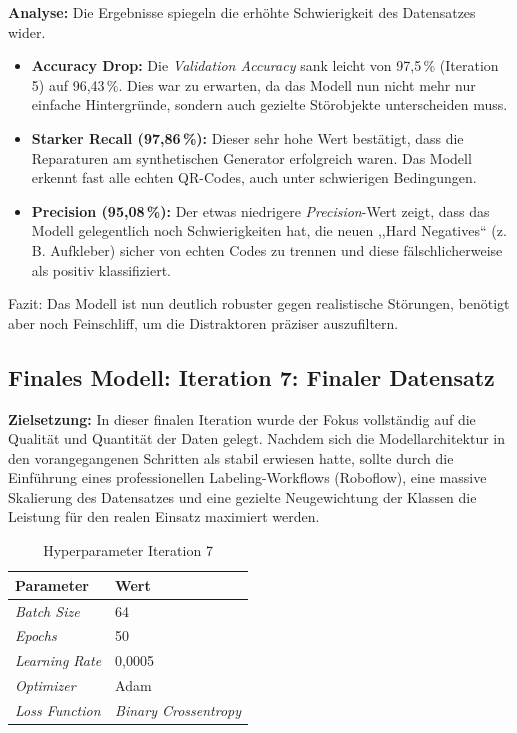 \documentclass[
    a4paper,        %
    11pt,           %
    ngerman,        %
    parskip=half,   %
    listof=totoc,   %
    bibliography=totoc %
]{scrartcl}
\begin{document}
\textbf{Analyse:}
Die Ergebnisse spiegeln die erhöhte Schwierigkeit des Datensatzes wider.
\begin{itemize}
    \item \textbf{Accuracy Drop:} Die \textit{Validation Accuracy} sank leicht von 97,5\,\% (Iteration 5) auf 96,43\,\%. Dies war zu erwarten, da das Modell nun nicht mehr nur einfache Hintergründe, sondern auch gezielte Störobjekte unterscheiden muss.
    \item \textbf{Starker Recall (97,86\,\%):} Dieser sehr hohe Wert bestätigt, dass die Reparaturen am synthetischen Generator erfolgreich waren. Das Modell erkennt fast alle echten QR-Codes, auch unter schwierigen Bedingungen.
    \item \textbf{Precision (95,08\,\%):} Der etwas niedrigere \textit{Precision}-Wert zeigt, dass das Modell gelegentlich noch Schwierigkeiten hat, die neuen ,,Hard Negatives`` (z.\,B. Aufkleber) sicher von echten Codes zu trennen und diese fälschlicherweise als positiv klassifiziert.
\end{itemize}
Fazit: Das Modell ist nun deutlich robuster gegen realistische Störungen, benötigt aber noch Feinschliff, um die Distraktoren präziser auszufiltern.

\subsection{Finales Modell: Iteration 7: Finaler Datensatz} \label{subsubsec:iter7}

\textbf{Zielsetzung:} In dieser finalen Iteration wurde der Fokus vollständig auf die Qualität und Quantität der Daten gelegt. Nachdem sich die Modellarchitektur in den vorangegangenen Schritten als stabil erwiesen hatte, sollte durch die Einführung eines professionellen Labeling-Workflows (Roboflow), eine massive Skalierung des Datensatzes und eine gezielte Neugewichtung der Klassen die Leistung für den realen Einsatz maximiert werden.

\begin{table}[H]
    \centering
    \caption{Hyperparameter Iteration 7}
    \label{tab:hyperparams_iter7}
    \begin{tabular}{ll}
        \toprule
        \textbf{Parameter} & \textbf{Wert} \\
        \midrule
        \textit{Batch Size} & 64 \\
        \textit{Epochs} & 50 \\
        \textit{Learning Rate} & 0,0005 \\
        \textit{Optimizer} & Adam \\
        \textit{Loss Function} & \textit{Binary Crossentropy} \\
        \bottomrule
    \end{tabular}
\end{table}
\end{document}
